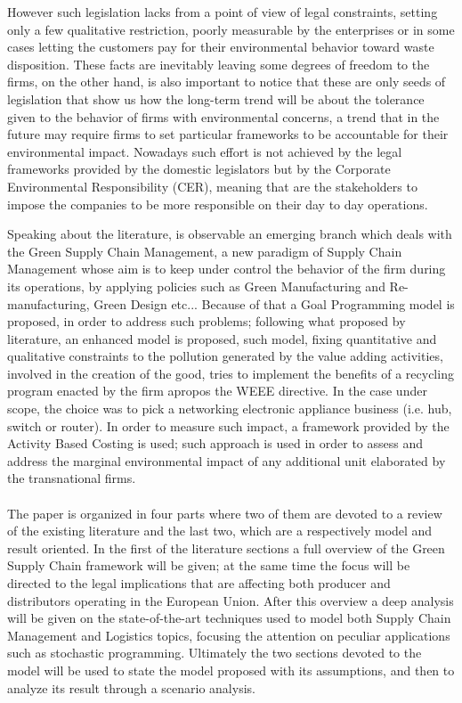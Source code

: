 \documentclass{article}
\begin{document}
  However such legislation lacks from a point of view of legal constraints, setting only a few qualitative restriction, poorly measurable by the enterprises or in some cases letting the customers pay for their environmental behavior toward waste disposition. These facts are inevitably leaving some degrees of freedom to the firms, on the other hand, is also important to notice that these are only seeds of legislation that show us how the long-term trend will be about the tolerance given to the behavior of firms with environmental concerns, a trend that in the future may require firms to set particular frameworks to be accountable for their environmental impact. Nowadays such effort is not achieved by the legal frameworks provided by the domestic legislators but by the Corporate Environmental Responsibility (CER), meaning that are the stakeholders to impose the companies to be more responsible on their day to day operations.

  Speaking about the literature, is observable an emerging branch which deals with the Green Supply Chain Management, a new paradigm of Supply Chain Management whose aim is to keep under control the behavior of the firm during its operations, by applying policies such as Green Manufacturing and Re-manufacturing, Green Design etc... Because of that a Goal Programming model is proposed, in order to address such problems; following what proposed by literature, an enhanced model is proposed, such model, fixing quantitative and qualitative constraints to the pollution generated by the value adding activities, involved in the creation of the good, tries to implement the benefits of a recycling program enacted by the firm apropos the WEEE directive. In the case under scope, the choice was to pick a networking electronic appliance business (i.e. hub, switch or router).  In order to measure such impact, a framework provided by the Activity Based Costing is used; such approach is used in order to assess and address the marginal environmental impact of any additional unit elaborated by the transnational firms.
\\
\\
The paper is organized in four parts where two of them are devoted to a review of the existing literature and the last two, which are a respectively model and result oriented. In the first of the literature sections a full overview of the Green Supply Chain framework will be given; at the same time the focus will be directed to the legal implications that are affecting both producer and distributors operating in the European Union. After this overview a deep analysis will be given on the state-of-the-art techniques used to model both Supply Chain Management and Logistics topics, focusing the attention on peculiar applications such as stochastic programming. Ultimately the two sections devoted to the model will be used to state the model proposed with its assumptions, and then to analyze its result through a scenario analysis.  
\end{document}
